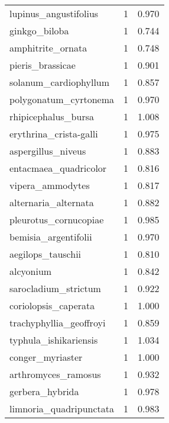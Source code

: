 \begin{tabular}{lrr}
          lupinus\_angustifolius &                   1 &     0.970 \\
                  ginkgo\_biloba &                   1 &     0.744 \\
              amphitrite\_ornata &                   1 &     0.748 \\
               pieris\_brassicae &                   1 &     0.901 \\
          solanum\_cardiophyllum &                   1 &     0.857 \\
          polygonatum\_cyrtonema &                   1 &     0.970 \\
            rhipicephalus\_bursa &                   1 &     1.008 \\
         erythrina\_crista-galli &                   1 &     0.975 \\
             aspergillus\_niveus &                   1 &     0.883 \\
          entacmaea\_quadricolor &                   1 &     0.816 \\
               vipera\_ammodytes &                   1 &     0.817 \\
           alternaria\_alternata &                   1 &     0.882 \\
          pleurotus\_cornucopiae &                   1 &     0.985 \\
           bemisia\_argentifolii &                   1 &     0.970 \\
              aegilops\_tauschii &                   1 &     0.810 \\
                      alcyonium &                   1 &     0.842 \\
           sarocladium\_strictum &                   1 &     0.922 \\
           coriolopsis\_caperata &                   1 &     1.000 \\
        trachyphyllia\_geoffroyi &                   1 &     0.859 \\
          typhula\_ishikariensis &                   1 &     1.034 \\
               conger\_myriaster &                   1 &     1.000 \\
            arthromyces\_ramosus &                   1 &     0.932 \\
                gerbera\_hybrida &                   1 &     0.978 \\
        limnoria\_quadripunctata &                   1 &     0.983 \\

\end{tabular}
